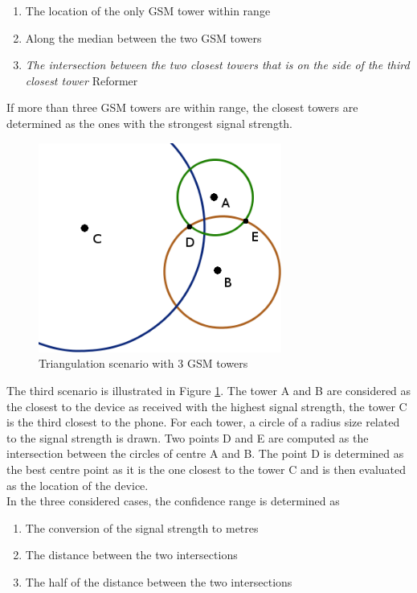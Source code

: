 \begin{enumerate}
\item The location of the only GSM tower within range
\item Along the median between the two GSM towers
\item \emph{The intersection between the two closest towers that is on the side of the third closest tower} Reformer
\end{enumerate}

If more than three GSM towers are within range, the closest towers are determined as the ones with the strongest signal strength.\\

\begin{figure}[h]
  \centering
  \includegraphics[width=8cm]{images/tower-schema.png}
  \caption{Triangulation scenario with 3 GSM towers}
  \label{fig:triangulation-scenario-3}
\end{figure}
The third scenario is illustrated in Figure \ref{fig:triangulation-scenario-3}.
The tower A and B are considered as the closest to the device as received with the highest signal strength, the tower C is the third closest to the phone.
For each tower, a circle of a radius size related to the signal strength is drawn.
Two points D and E are computed as the intersection between the circles of centre A and B.
The point D is determined as the best centre point as it is the one closest to the tower C and is then evaluated as the location of the device.\\

In the three considered cases, the confidence range is determined as
\begin{enumerate}
\item The conversion of the signal strength to metres
\item The distance between the two intersections
\item The half of the distance between the two intersections
\end{enumerate}

